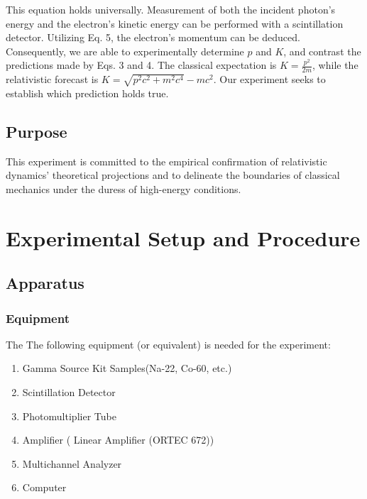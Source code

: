 \documentclass[12pt]{article}
\begin{document}
                    This equation holds universally. Measurement of both the incident photon's energy and the electron's kinetic energy can be performed with a scintillation detector. Utilizing Eq. 5, the electron's momentum can be deduced. Consequently, we are able to experimentally determine \( p \) and \( K \), and contrast the predictions made by Eqs. 3 and 4. The classical expectation is \( K = \frac{p^2}{2m} \), while the relativistic forecast is \( K = \sqrt{ p^2c^2 + m^2c^4 } - mc^2 \). Our experiment seeks to establish which prediction holds true.

    \subsection{Purpose}
            This experiment is committed to the empirical confirmation of relativistic dynamics' theoretical projections and to delineate the boundaries of classical mechanics under the duress of high-energy conditions.


\section{Experimental Setup and Procedure}
        \subsection{Apparatus}
                \subsubsection{Equipment}
                The The following equipment (or equivalent) is needed for the experiment:

                        \begin{enumerate}
                                \item Gamma Source Kit Samples(Na-22, Co-60, etc.)
                                \item Scintillation Detector
                                \item Photomultiplier Tube
                                \item Amplifier ( Linear Amplifier (ORTEC 672))
                                \item Multichannel Analyzer
                                \item Computer
                        \end{enumerate}
                        
\end{document}
